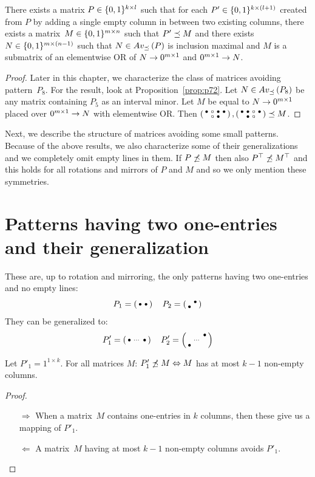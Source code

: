 \begin{prop}
There exists a matrix $P\in\{0,1\}^{k\times l}$ such that for each $P'\in\{0,1\}^{k\times(l+1)}$ created from $P$ by adding a single empty column in between two existing columns, there exists a matrix~$M\in\{0,1\}^{m\times n}$ such that $P'\preceq M$ and there exists $N\in\{0,1\}^{m\times(n-1)}$ such that $N\in Av_{\preceq}\left(P\right)$ is inclusion maximal and $M$ is a submatrix of an elementwise OR of $N\rightarrow 0^{m\times 1}$ and $0^{m\times 1}\rightarrow N$.
\end{prop}
\begin{proof}
Later in this chapter, we characterize the class of matrices avoiding pattern~$P_8$. For the result, look at Proposition~\ref{prop:p72}. Let $N\in Av_{\preceq}\left(P_8\right)$ be any matrix containing $P_5$ as an interval minor. Let $M$ be equal to $N\rightarrow 0^{m\times 1}$ placed over $0^{m\times 1}\rightarrow N$ with elementwise OR. Then $\left(\begin{smallmatrix}\bullet&\circ&\bullet&\bullet\\ &\circ&\bullet& \end{smallmatrix}\right),\left(\begin{smallmatrix}\bullet&\bullet&\circ&\bullet\\ &\bullet&\circ& \end{smallmatrix}\right)\preceq M$.
\end{proof}

Next, we describe the structure of matrices avoiding some small patterns. Because of the above results, we also characterize some of their generalizations and we completely omit empty lines in them. If $P\not\preceq M$ then also $P^\top\not\preceq M^\top$ and this holds for all rotations and mirrors of $P$ and $M$ and so we only mention these symmetries.

\section{Patterns having two one-entries and their generalization}
\label{sec:2ones}
These are, up to rotation and mirroring, the only patterns having two one-entries and no empty lines:
$$P_1=\smm{\bullet&\bullet}\ \ 
\ P_2=\smm{ &\bullet\\\bullet& }$$
They can be generalized to:
$$P'_1=\smm{\bullet&\cdots&\bullet}\ \ 
\ P'_2=\smm{ & &\bullet\\ &\cdots& \\\bullet& & }$$

\begin{prop}
Let $P'_1=1^{1\times k}$. For all matrices $M$: $P'_1\not\preceq M\Leftrightarrow M$ has at most $k-1$ non-empty columns.
\end{prop}
\begin{proof}
\begin{itemize}
	\item[$\Rightarrow$] When a matrix~$M$ contains one-entries in $k$ columns, then these give us a mapping of $P'_1$.
	\item[$\Leftarrow$] A matrix~$M$ having at most $k-1$ non-empty columns avoids $P'_1$.
\end{itemize}
\end{proof}

